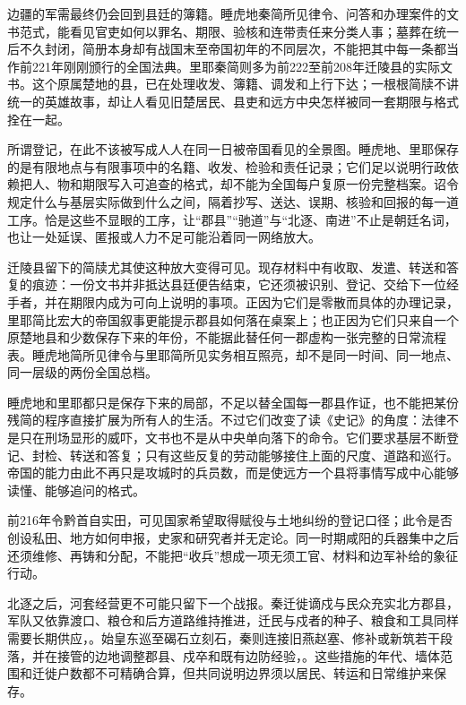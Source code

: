 边疆的军需最终仍会回到县廷的簿籍。睡虎地秦简所见律令、问答和办理案件的文书范式，能看见官吏如何以罪名、期限、验核和连带责任来分类人事；墓葬在统一后不久封闭，简册本身却有战国末至帝国初年的不同层次，不能把其中每一条都当作前221年刚刚颁行的全国法典。里耶秦简则多为前222至前208年迁陵县的实际文书。这个原属楚地的县，已在处理收发、簿籍、调发和上行下达；一根根简牍不讲统一的英雄故事，却让人看见旧楚居民、县吏和远方中央怎样被同一套期限与格式拴在一起。

所谓登记，在此不该被写成人人在同一日被帝国看见的全景图。睡虎地、里耶保存的是有限地点与有限事项中的名籍、收发、检验和责任记录；它们足以说明行政依赖把人、物和期限写入可追查的格式，却不能为全国每户复原一份完整档案。诏令规定什么与基层实际做到什么之间，隔着抄写、送达、误期、核验和回报的每一道工序。恰是这些不显眼的工序，让“郡县”“驰道”与“北逐、南进”不止是朝廷名词，也让一处延误、匿报或人力不足可能沿着同一网络放大。

迁陵县留下的简牍尤其使这种放大变得可见。现存材料中有收取、发遣、转送和答复的痕迹：一份文书并非抵达县廷便告结束，它还须被识别、登记、交给下一位经手者，并在期限内成为可向上说明的事项。正因为它们是零散而具体的办理记录，里耶简比宏大的帝国叙事更能提示郡县如何落在桌案上；也正因为它们只来自一个原楚地县和少数保存下来的年份，不能据此替任何一郡虚构一张完整的日常流程表。睡虎地简所见律令与里耶简所见实务相互照亮，却不是同一时间、同一地点、同一层级的两份全国总档。

睡虎地和里耶都只是保存下来的局部，不足以替全国每一郡县作证，也不能把某份残简的程序直接扩展为所有人的生活。不过它们改变了读《史记》的角度：法律不是只在刑场显形的威吓，文书也不是从中央单向落下的命令。它们要求基层不断登记、封检、转送和答复；只有这些反复的劳动能够接住上面的尺度、道路和巡行。帝国的能力由此不再只是攻城时的兵员数，而是使远方一个县将事情写成中心能够读懂、能够追问的格式。

前216年令黔首自实田，可见国家希望取得赋役与土地纠纷的登记口径；此令是否创设私田、地方如何申报，史家和研究者并无定论。同一时期咸阳的兵器集中之后还须维修、再铸和分配，不能把“收兵”想成一项无须工官、材料和边军补给的象征行动。

北逐之后，河套经营更不可能只留下一个战报。秦迁徙谪戍与民众充实北方郡县，军队又依靠渡口、粮仓和后方道路维持推进，迁民与戍者的种子、粮食和工具同样需要长期供应，。始皇东巡至碣石立刻石，秦则连接旧燕赵塞、修补或新筑若干段落，并在接管的边地调整郡县、戍卒和既有边防经验，。这些措施的年代、墙体范围和迁徙户数都不可精确合算，但共同说明边界须以居民、转运和日常维护来保存。

